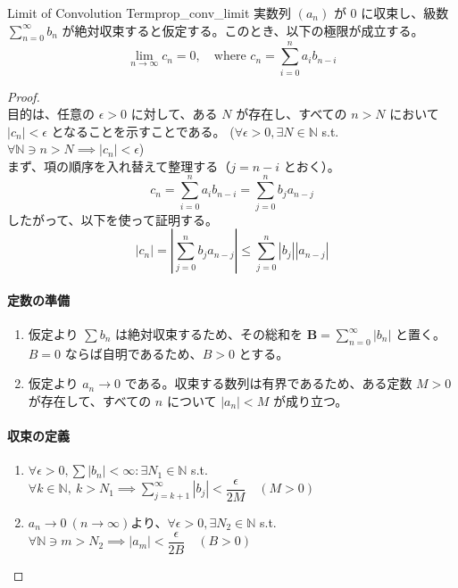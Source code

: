 \documentclass[dvipdfmx,a4paper,11pt]{jsarticle}
\begin{document}
\begin{reidai}{Limit of Convolution Term}{prop_conv_limit}
    実数列 $(a_n)$ が $0$ に収束し、級数 $\sum_{n=0}^\infty b_n$ が絶対収束すると仮定する。このとき、以下の極限が成立する。
    \[ \lim_{n \to \infty} c_n = 0, \quad \text{where } c_n = \sum_{i=0}^{n} a_i b_{n-i} \]
\end{reidai}
\vspace{0.5em}
\begin{proof}\ \\
\noindent
目的は、任意の $\epsilon > 0$ に対して、ある $N$ が存在し、すべての $n > N$ において $|c_n| < \epsilon$ となることを示すことである。
(\ie $\forall\epsilon > 0, \exists N \in \mathbb{N}$ s.t. $\forall \mathbb{N} \ni n > N\implies |c_n| < \epsilon$)\\ 
まず、項の順序を入れ替えて整理する（$j = n-i$ とおく）。
\[
c_n = \sum_{i=0}^{n} a_i b_{n-i} = \sum_{j=0}^{n} b_j a_{n-j}
\]
したがって、以下を使って証明する。
\[
|c_n| = \left| \sum_{j=0}^{n} b_j a_{n-j} \right| \le \sum_{j=0}^{n} |b_j| |a_{n-j}|
\]

\paragraph{定数の準備}
\begin{enumerate}
    \item 仮定より $\sum b_n$ は絶対収束するため、その総和を $\mathbf{B} = \sum_{n=0}^\infty |b_n|$ と置く。$B=0$ ならば自明であるため、$B > 0$ とする。
    \item 仮定より $a_n \to 0$ である。収束する数列は有界であるため、ある定数 $M > 0$ が存在して、すべての $n$ について $|a_n| < M$ が成り立つ。
\end{enumerate}

\paragraph{収束の定義}
\begin{enumerate}
  \item  $\forall \epsilon >0, \sum |b_n|< \infty: \exists N_1 \in \mathbb{N}$ s.t. $\forall k \in \mathbb{N},\ k > N_1\implies \sum_{j=k+1}^{\infty} |b_j|  < \dfrac{\epsilon}{2M}\quad (M>0)$
  \vspace{1em}
  \item  $a_n\to 0\ (n\to \infty)$より、$\forall \epsilon > 0, \exists N_2 \in \mathbb{N}$ s.t. $\forall \mathbb{N}\ni m > N_2\implies |a_m| < \dfrac{\epsilon}{2B}\quad (B>0)$
  

\end{enumerate}
\end{proof}
\end{document}
